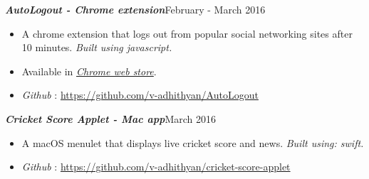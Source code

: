 \documentclass[11pt,a4paper]{article}
\begin{document}
\emph{\textbf{AutoLogout - Chrome extension}}{\hfill February - March 2016}
\begin{itemize}[noitemsep]
\item A chrome extension that logs out from popular social networking sites after 10 minutes. \emph{Built using javascript.}
\item Available in \href{https://chrome.google.com/webstore/detail/auto-logout/affkccgnaoeohjnojjnpdalhpjhdiebh?hl=en}{\emph{Chrome web store}}.
\item \emph{Github} : \href{https://github.com/v-adhithyan/AutoLogout}{https://github.com/v-adhithyan/AutoLogout}
\end{itemize}
\emph{\textbf{Cricket Score Applet - Mac app}}{\hfill March 2016}
\begin{itemize}[noitemsep]
\item A macOS menulet that displays live cricket score and news. \emph{Built using: swift.}
\item \emph{Github} : \href{https://github.com/v-adhithyan/cricket-score-applet}{https://github.com/v-adhithyan/cricket-score-applet}
\end{itemize}
\end{document}
